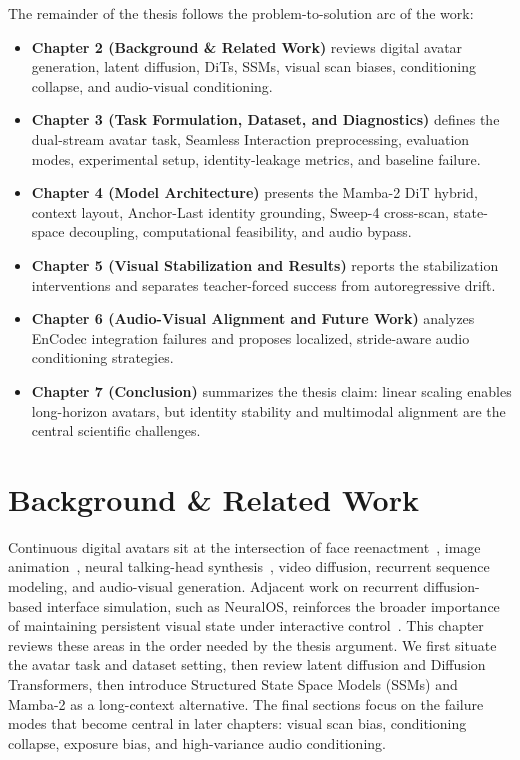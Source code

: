 \documentclass[12pt,letterpaper]{report}
\begin{document}
The remainder of the thesis follows the problem-to-solution arc of the work:
\begin{itemize}
    \item \textbf{Chapter 2 (Background \& Related Work)} reviews digital avatar generation, latent diffusion, DiTs, SSMs, visual scan biases, conditioning collapse, and audio-visual conditioning.
    \item \textbf{Chapter 3 (Task Formulation, Dataset, and Diagnostics)} defines the dual-stream avatar task, Seamless Interaction preprocessing, evaluation modes, experimental setup, identity-leakage metrics, and baseline failure.
    \item \textbf{Chapter 4 (Model Architecture)} presents the Mamba-2 DiT hybrid, context layout, Anchor-Last identity grounding, Sweep-4 cross-scan, state-space decoupling, computational feasibility, and audio bypass.
    \item \textbf{Chapter 5 (Visual Stabilization and Results)} reports the stabilization interventions and separates teacher-forced success from autoregressive drift.
    \item \textbf{Chapter 6 (Audio-Visual Alignment and Future Work)} analyzes EnCodec integration failures and proposes localized, stride-aware audio conditioning strategies.
    \item \textbf{Chapter 7 (Conclusion)} summarizes the thesis claim: linear scaling enables long-horizon avatars, but identity stability and multimodal alignment are the central scientific challenges.
\end{itemize}

\chapter{Background \& Related Work}

Continuous digital avatars sit at the intersection of face reenactment~\cite{thies2016face}, image animation~\cite{siarohin2019first}, neural talking-head synthesis~\cite{wang2021facevid2vid}, video diffusion, recurrent sequence modeling, and audio-visual generation. Adjacent work on recurrent diffusion-based interface simulation, such as NeuralOS, reinforces the broader importance of maintaining persistent visual state under interactive control~\cite{rivard2026neuralos}. This chapter reviews these areas in the order needed by the thesis argument. We first situate the avatar task and dataset setting, then review latent diffusion and Diffusion Transformers, then introduce Structured State Space Models (SSMs) and Mamba-2 as a long-context alternative. The final sections focus on the failure modes that become central in later chapters: visual scan bias, conditioning collapse, exposure bias, and high-variance audio conditioning.
\end{document}
